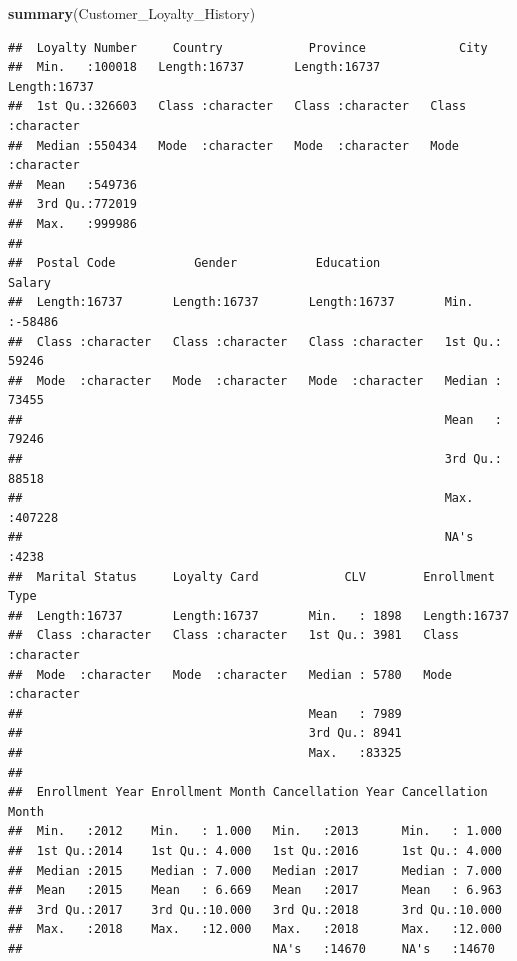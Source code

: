 \documentclass[
]{article}
\newenvironment{Shaded}{\begin{snugshade}}{\end{snugshade}}
\newcommand{\FunctionTok}[1]{\textcolor[rgb]{0.13,0.29,0.53}{\textbf{#1}}}
\newcommand{\NormalTok}[1]{#1}
\begin{document}
\begin{Shaded}
\begin{Highlighting}[]
\FunctionTok{summary}\NormalTok{(Customer\_Loyalty\_History)}
\end{Highlighting}
\end{Shaded}

\begin{verbatim}
##  Loyalty Number     Country            Province             City          
##  Min.   :100018   Length:16737       Length:16737       Length:16737      
##  1st Qu.:326603   Class :character   Class :character   Class :character  
##  Median :550434   Mode  :character   Mode  :character   Mode  :character  
##  Mean   :549736                                                           
##  3rd Qu.:772019                                                           
##  Max.   :999986                                                           
##                                                                           
##  Postal Code           Gender           Education             Salary      
##  Length:16737       Length:16737       Length:16737       Min.   :-58486  
##  Class :character   Class :character   Class :character   1st Qu.: 59246  
##  Mode  :character   Mode  :character   Mode  :character   Median : 73455  
##                                                           Mean   : 79246  
##                                                           3rd Qu.: 88518  
##                                                           Max.   :407228  
##                                                           NA's   :4238    
##  Marital Status     Loyalty Card            CLV        Enrollment Type   
##  Length:16737       Length:16737       Min.   : 1898   Length:16737      
##  Class :character   Class :character   1st Qu.: 3981   Class :character  
##  Mode  :character   Mode  :character   Median : 5780   Mode  :character  
##                                        Mean   : 7989                     
##                                        3rd Qu.: 8941                     
##                                        Max.   :83325                     
##                                                                          
##  Enrollment Year Enrollment Month Cancellation Year Cancellation Month
##  Min.   :2012    Min.   : 1.000   Min.   :2013      Min.   : 1.000    
##  1st Qu.:2014    1st Qu.: 4.000   1st Qu.:2016      1st Qu.: 4.000    
##  Median :2015    Median : 7.000   Median :2017      Median : 7.000    
##  Mean   :2015    Mean   : 6.669   Mean   :2017      Mean   : 6.963    
##  3rd Qu.:2017    3rd Qu.:10.000   3rd Qu.:2018      3rd Qu.:10.000    
##  Max.   :2018    Max.   :12.000   Max.   :2018      Max.   :12.000    
##                                   NA's   :14670     NA's   :14670
\end{verbatim}
\end{document}

